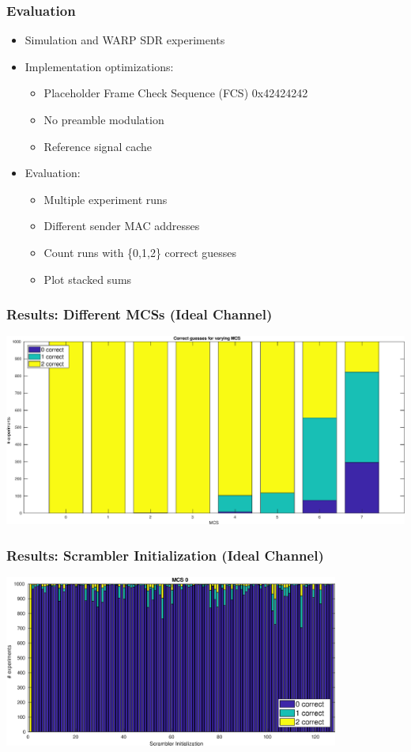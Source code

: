 \documentclass[accentcolor=tud8b,colorbacktitle]{tudbeamer}
\begin{document}
\begin{frame}
\frametitle{Evaluation}
\begin{itemize}
	\setlength\itemsep{1em}
	\item Simulation and WARP SDR experiments
	\item Implementation optimizations:
	\begin{itemize}
		\item Placeholder Frame Check Sequence (FCS) 0x42424242
		\item No preamble modulation
		\item Reference signal cache
	\end{itemize}
	\item Evaluation:
	\begin{itemize}
		\item Multiple experiment runs
		\item Different sender MAC addresses
		\item Count runs with \{0,1,2\} correct guesses
		\item Plot stacked sums
	\end{itemize}
\end{itemize}
\end{frame}


\begin{frame}
\frametitle{Results: Different MCSs (Ideal Channel)}
\begin{centering}
	\includegraphics[width=\textwidth]{../../gfx/plots/mcs}\\
\end{centering}
\end{frame}


\begin{frame}
\frametitle{Results: Scrambler Initialization (Ideal Channel)}
\begin{centering}
	\includegraphics[width=11cm]{../../gfx/plots/scrambler}\\
\end{centering}
\end{frame}
\end{document}
